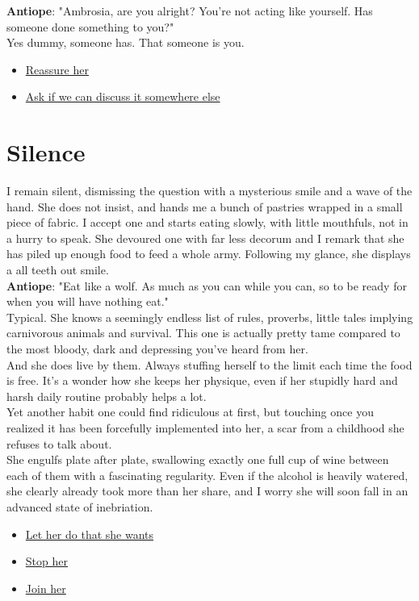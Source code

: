 \documentclass{report}
\newcommand{\speaker}[1]{
	\textbf{#1}: 
}
\newcommand{\glink}[2]{
	\hyperref[#1]{#2}
}
\newcommand{\gsection}[1]{
	\section*{#1}
	\label{#1}
}
\begin{document}
\speaker{Antiope} "Ambrosia, are you alright? You're not acting like yourself. Has someone done something to you?"\\

Yes dummy, someone has. That someone is you.

\begin{itemize}
	\item \glink{It's nothing}{Reassure her}
	\item \glink{The garden}{Ask if we can discuss it somewhere else}
\end{itemize}

\gsection{Silence}

I remain silent, dismissing the question with a mysterious smile and a wave of the hand. She does not insist, and hands me a bunch of pastries wrapped in a small piece of fabric. I accept one and starts eating slowly, with little mouthfuls, not in a hurry to speak. She devoured one with far less decorum and I remark that she has piled up enough food to feed a whole army. Following my glance, she displays a all teeth out smile.\\

\speaker{Antiope} "Eat like a wolf. As much as you can while you can, so to be ready for when you will have nothing eat."\\

Typical. She knows a seemingly endless list of rules, proverbs, little tales implying carnivorous animals and survival. This one is actually pretty tame compared to the most bloody, dark and depressing you've heard from her.\\

And she does live by them. Always stuffing herself to the limit each time the food is free. It's a wonder how she keeps her physique, even if her stupidly hard and harsh daily routine probably helps a lot.\\

Yet another habit one could find ridiculous at first, but touching once you realized it has been forcefully implemented into her, a scar from a childhood she refuses to talk about.\\

She engulfs plate after plate, swallowing exactly one full cup of wine between each of them with a fascinating regularity. Even if the alcohol is heavily watered, she clearly already took more than her share, and I worry she will soon fall in an advanced state of inebriation.

\begin{itemize}
	\item \glink{Stupor}{Let her do that she wants}
	\item \glink{Sobriety}{Stop her}
	\item \glink{Drunk}{Join her}
\end{itemize}
\end{document}
